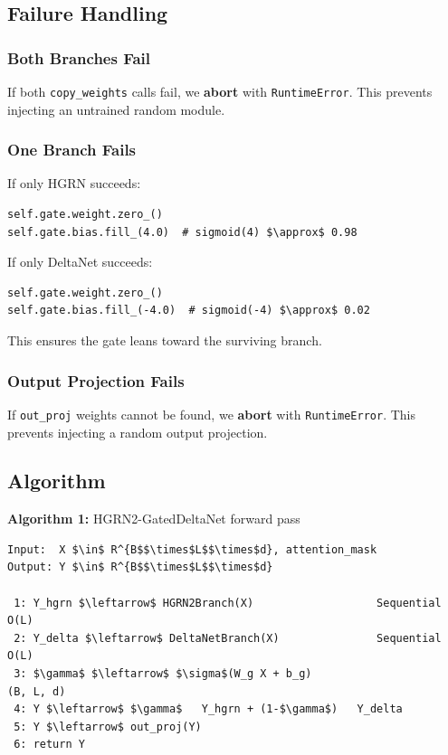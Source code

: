 \subsection{Failure Handling}

\subsubsection{Both Branches Fail}

If both \texttt{copy\_weights} calls fail, we \textbf{abort} with \texttt{RuntimeError}. This 
prevents injecting an untrained random module.

\subsubsection{One Branch Fails}

If only HGRN succeeds:
\begin{lstlisting}
self.gate.weight.zero_()
self.gate.bias.fill_(4.0)  # sigmoid(4) $\approx$ 0.98
\end{lstlisting}

If only DeltaNet succeeds:
\begin{lstlisting}
self.gate.weight.zero_()
self.gate.bias.fill_(-4.0)  # sigmoid(-4) $\approx$ 0.02
\end{lstlisting}

This ensures the gate leans toward the surviving branch.

\subsubsection{Output Projection Fails}

If \texttt{out\_proj} weights cannot be found, we \textbf{abort} with \texttt{RuntimeError}. 
This prevents injecting a random output projection.

\subsection{Algorithm}

\textbf{Algorithm 1:} HGRN2-GatedDeltaNet forward pass
\begin{lstlisting}
Input:  X $\in$ R^{B$$\times$L$$\times$d}, attention_mask
Output: Y $\in$ R^{B$$\times$L$$\times$d}

 1: Y_hgrn $\leftarrow$ HGRN2Branch(X)                   Sequential O(L)
 2: Y_delta $\leftarrow$ DeltaNetBranch(X)               Sequential O(L)
 3: $\gamma$ $\leftarrow$ $\sigma$(W_g X + b_g)                        (B, L, d)
 4: Y $\leftarrow$ $\gamma$   Y_hgrn + (1-$\gamma$)   Y_delta
 5: Y $\leftarrow$ out_proj(Y)
 6: return Y
\end{lstlisting}

